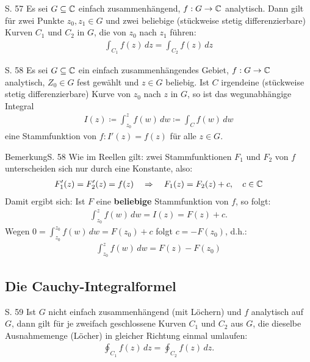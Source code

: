 \begin{satz}{S. 57}
  \label{satz:5_3}
  Es sei $G \subseteq \mathbb{C}$ einfach zusammenhängend, $f: G \to \mathbb{C}$ analytisch.
  Dann gilt für zwei Punkte $z_0, z_1 \in G$ und zwei beliebige (stückweise stetig differenzierbare) Kurven $C_1$ und $C_2$ in $G$, die von $z_0$ nach $z_1$ führen:
  \begin{align}
    \int_{C_1} f(z) \, dz = \int_{C_2} f(z) \, dz
  \end{align}
\end{satz}

\begin{satz}{S. 58}
  Es sei $G \subseteq \mathbb{C}$ ein einfach zusammenhängendes Gebiet, $f: G \to \mathbb{C}$ analytisch, $Z_0 \in G$ fest gewählt und $z \in G$ beliebig.
  Ist $C$ irgendeine (stückweise stetig differenzierbare) Kurve von $z_0$ nach $z$ in $G$, so ist das wegunabhängige Integral
  \begin{align}
    I(z) \coloneqq \int_{z_0}^z f(w) \, dw \coloneqq \int_C f(w) \, dw
  \end{align}
  eine Stammfunktion von $f: I'(z) = f(z)$ für alle $z \in G$.
\end{satz}

\begin{bemerkung}{Bemerkung}{S. 58}
  Wie im Reellen gilt: zwei Stammfunktionen $F_1$ und $F_2$ von $f$ unterscheiden sich nur durch eine Konstante, also:
  \begin{align}
    F_1'(z) = F_2'(z) = f(z)
    \quad \Rightarrow \quad
    F_1(z) = F_2(z) + c, \quad c \in \mathbb{C}
  \end{align}
  Damit ergibt sich: Ist $F$ eine \textbf{beliebige} Stammfunktion von $f$, so folgt:
  \begin{align}
    \int_{z_0}^z f(w) \, dw = I(z) = F(z) + c .
  \end{align}
  Wegen $\displaystyle 0 = \int_{z_0}^{z_0} f(w) \, dw = F(z_0) + c$ folgt $c = -F(z_0)$, d.h.:
  \begin{align}
    \int_{z_0}^z f(w) \, dw = F(z) - F(z_0)
  \end{align}
\end{bemerkung}



\subsection{Die Cauchy-Integralformel}

\begin{satz}{S. 59}
  Ist $G$ nicht einfach zusammenhängend (mit \glqq Löchern\grqq ) und $f$ analytisch auf $G$, dann gilt für je zweifach geschlossene Kurven $C_1$ und $C_2$ aus $G$, die dieselbe Ausnahmemenge (\glqq Löcher\grqq ) in gleicher Richtung einmal umlaufen:
  \begin{align}
    \oint_{C_1} f(z) \, dz = \oint_{C_2} f(z) \, dz .
  \end{align}
\end{satz}


